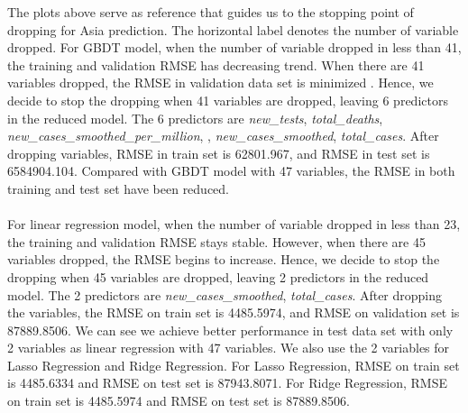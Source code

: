 \documentclass{article}
\begin{document}
The plots above serve as reference that guides us to the stopping point of dropping for Asia prediction. The horizontal label denotes the number of variable dropped. For GBDT model, when the number of variable dropped in less than 41, the training and validation RMSE has decreasing trend. When there are 41 variables dropped, the RMSE in validation data set is minimized . Hence, we decide to stop the dropping when 41 variables are dropped, leaving 6 predictors in the reduced model. The 6 predictors are \textit{new\_tests}, \textit{total\_deaths}, \textit{new\_cases\_smoothed\_per\_million}, , \textit{new\_cases\_smoothed}, \textit{total\_cases}. After dropping variables, RMSE in train set is 62801.967, and RMSE in test set is 6584904.104. Compared with GBDT model with 47 variables, the RMSE in both training and test set have been reduced. \\
\\
For linear regression model, when the number of variable dropped in less than 23, the training and validation RMSE stays stable. However, when there are 45 variables dropped, the RMSE begins to increase. Hence, we decide to stop the dropping when 45 variables are dropped, leaving 2 predictors in the reduced model. The 2 predictors are \textit{new\_cases\_smoothed}, \textit{total\_cases}. After dropping the variables, the RMSE on train set is  4485.5974, and RMSE on validation set is 87889.8506. We can see we achieve better performance in test data set with only 2 variables as linear regression with 47 variables. We also use the 2 variables for Lasso Regression and Ridge Regression. For Lasso Regression, RMSE on train set is  4485.6334 and RMSE on test set is  87943.8071. For Ridge Regression, RMSE on train set is 4485.5974 and RMSE on test set is  87889.8506.
\end{document}
